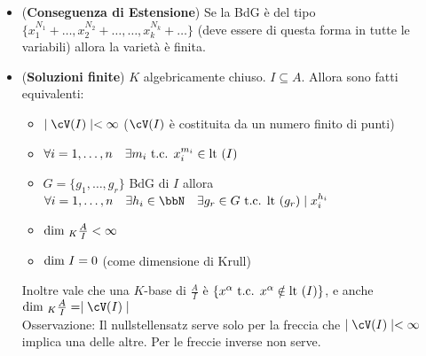 \documentclass[a4paper,NoNotes,GeneralMath]{stdmdoc}
\newcommand{\Lt}{\text{lt }}
\begin{document}
\begin{itemize}
\begin{itemize}
				\item ({\bf Conseguenza di Estensione}) Se la BdG è del tipo $\{x_1^{N_1} + \ldots, x_2^{N_2} + \ldots, \ldots, x_k^{N_k} + \ldots \}$ (deve essere di questa forma in tutte le variabili) allora la varietà è finita.
				\item ({\bf Soluzioni finite}) $K$ algebricamente chiuso. $I \subseteq A$. Allora sono fatti equivalenti:
					\begin{itemize}
						\item $\mid \cV(I) \mid < \infty$ ($\cV(I)$ è costituita da un numero finito di punti)
						\item $\forall i = 1, \ldots, n \quad \exists m_i \tc x_i^{m_i} \in \Lt(I)$
						\item $G = \{ g_1, \ldots, g_r\}$ BdG di $I$ allora $\forall i = 1, \ldots, n \quad \exists h_i \in \bbN \quad \exists g_r \in G \tc \Lt(g_r) \mid x_i^{h_i}$
						\item $\mbox{dim }_K \frac{A}{I} < \infty$
						\item $\mbox{dim } I = 0$ (come dimensione di Krull)
					\end{itemize}
					Inoltre vale che una $K$-base di $\frac{A}{I}$ è $\{x^\alpha \tc x^\alpha \notin \Lt(I)\}$, e anche $\Dim_K \frac{A}{I} = \mid \cV(I) \mid$ \\
					Osservazione: Il nullstellensatz serve solo per la freccia che $\mid \cV(I) \mid < \infty$ implica una delle altre. Per le freccie inverse non serve.
			\end{itemize}
	\end{itemize}
	
\end{document}
